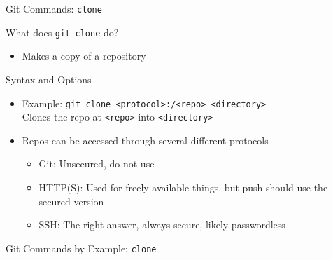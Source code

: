 \documentclass[table,dvipsnames]{beamer}
\begin{document}
\begin{frame}{Git Commands: \texttt{clone}}
	\begin{block}{What does \texttt{git clone} do?}
		\begin{itemize}
			\item Makes a copy of a repository
		\end{itemize}
	\end{block}
	\begin{block}{Syntax and Options}
		\begin{itemize}
			\item Example: \texttt{git clone <protocol>:/<repo> <directory>} \\
				Clones the repo at \texttt{<repo>} into \texttt{<directory>}
			\item Repos can be accessed through several different protocols
				\begin{itemize}
					\item Git: Unsecured, do not use
					\item HTTP(S): Used for freely available things, but push should use the secured
						version
					\item SSH: The right answer, always secure, likely passwordless
				\end{itemize}
		\end{itemize}
	\end{block}
\end{frame}


\begin{frame}{Git Commands by Example: \texttt{clone}}
\end{frame}
\end{document}
